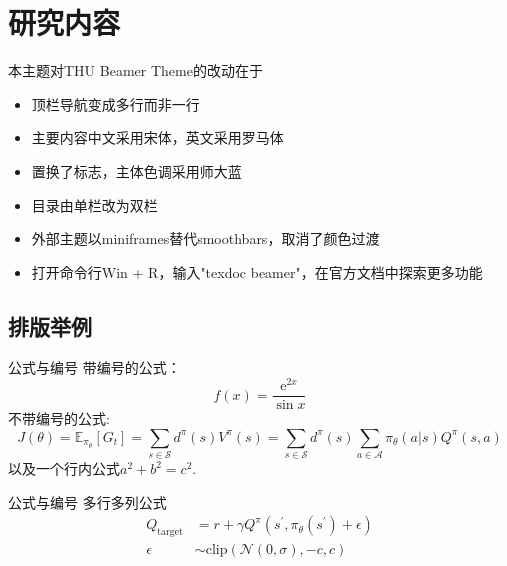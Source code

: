 \documentclass{beamer}
\begin{document}
\section{研究内容}

\begin{frame}{本主题对THU Beamer Theme的改动在于}
    \begin{itemize}
        \item 顶栏导航变成多行而非一行
        \item 主要内容中文采用宋体，英文采用罗马体
        \item 置换了标志，主体色调采用师大蓝
        \item 目录由单栏改为双栏
        \item 外部主题以miniframes替代smoothbars，取消了颜色过渡
        \item 打开命令行Win + R，输入"texdoc beamer"，在官方文档中探索更多功能
    \end{itemize}
\end{frame}

\subsection{排版举例}

\begin{frame}{公式与编号}
    带编号的公式：
    \begin{equation}
        f(x) = \frac{\mathrm e^{2x}}{\sin x}
        \end{equation}
    不带编号的公式:
    \begin{equation*}
        J(\theta) = \mathbb{E}_{\pi_\theta}[G_t] = \sum_{s\in\mathcal{S}} d^\pi (s)V^\pi(s)=\sum_{s\in\mathcal{S}} d^\pi(s)\sum_{a\in\mathcal{A}}\pi_\theta(a|s)Q^\pi(s,a)
    \end{equation*}
    以及一个行内公式$a^2 + b^2 = c^2$.
\end{frame}

\begin{frame}{公式与编号}
    多行多列公式 %
    \begin{align}
            Q_\mathrm{target}&=r+\gamma Q^\pi(s^\prime, \pi_\theta(s^\prime)+\epsilon)\\
            \epsilon&\sim\mathrm{clip}(\mathcal{N}(0, \sigma), -c, c)\nonumber
    \end{align}
\end{frame}
\end{document}

